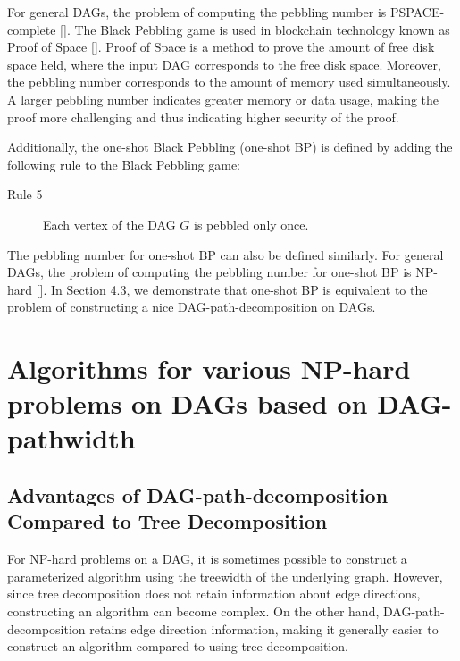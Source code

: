 \documentclass[runningheads]{llncs}
\theoremstyle{plain}
\theoremstyle{definition}
\begin{document}
For general DAGs, the problem of computing the pebbling number is PSPACE-complete [\cite{art14}]. The Black Pebbling game is used in blockchain technology known as Proof of Space [\cite{art15}]. Proof of Space is a method to prove the amount of free disk space held, where the input DAG corresponds to the free disk space. Moreover, the pebbling number corresponds to the amount of memory used simultaneously. A larger pebbling number indicates greater memory or data usage, making the proof more challenging and thus indicating higher security of the proof.

Additionally, the one-shot Black Pebbling (one-shot BP) is defined by adding the following rule to the Black Pebbling game:

\begin{description}
    \item[Rule 5] Each vertex of the DAG $G$ is pebbled only once.
\end{description}

The pebbling number for one-shot BP can also be defined similarly. For general DAGs, the problem of computing the pebbling number for one-shot BP is NP-hard [\cite{art16}]. In Section 4.3, we demonstrate that one-shot BP is equivalent to the problem of constructing a nice DAG-path-decomposition on DAGs.























\section{Algorithms for various NP-hard problems on DAGs based on DAG-pathwidth}

\subsection{Advantages of DAG-path-decomposition Compared to Tree Decomposition}

For NP-hard problems on a DAG, it is sometimes possible to construct a parameterized algorithm using the treewidth of the underlying graph.  
However, since tree decomposition does not retain information about edge directions, constructing an algorithm can become complex.  
On the other hand, DAG-path-decomposition retains edge direction information, making it generally easier to construct an algorithm compared to using tree decomposition.  
\end{document}
